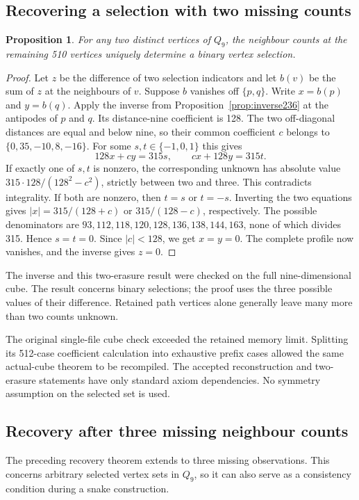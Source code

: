 \documentclass[11pt,a4paper]{article}
\newtheorem{proposition}[theorem]{Proposition}
\theoremstyle{definition}
\theoremstyle{remark}
\newcommand{\Q}{Q}
\begin{document}
\subsection{Recovering a selection with two missing counts}\label{sec:erasure237}
\begin{proposition}
For any two distinct vertices of $\Q_9$, the neighbour counts at the
remaining 510 vertices uniquely determine a binary vertex selection.
\end{proposition}
\begin{proof}
Let $z$ be the difference of two selection indicators and let $b(v)$
be the sum of $z$ at the neighbours of $v$. Suppose $b$ vanishes off
$\{p,q\}$. Write $x=b(p)$ and $y=b(q)$. Apply the inverse from
Proposition~\ref{prop:inverse236} at the antipodes of $p$ and $q$.
Its distance-nine coefficient is 128. The two off-diagonal distances
are equal and below nine, so their common coefficient $c$ belongs to
$\{0,35,-10,8,-16\}$. For some $s,t\in\{-1,0,1\}$ this gives
\[
 128x+cy=315s,\qquad cx+128y=315t.
\]
If exactly one of $s,t$ is nonzero, the corresponding unknown has
absolute value $315\cdot128/(128^2-c^2)$, strictly between two and
three. This contradicts integrality. If both are nonzero, then $t=s$
or $t=-s$. Inverting the two equations gives
$|x|=315/(128+c)$ or $315/(128-c)$, respectively. The possible
denominators are $93,112,118,120,128,136,138,144,163$, none of which
divides 315. Hence $s=t=0$. Since $|c|<128$, we get $x=y=0$.
The complete profile now vanishes, and the inverse gives $z=0$.
\end{proof}
The inverse and this two-erasure result were checked on the full
nine-dimensional cube. The result concerns binary selections; the proof
uses the three possible values of their difference. Retained path
vertices alone generally leave many more than two counts unknown.


The original single-file cube check exceeded the retained memory limit.
Splitting its 512-case coefficient calculation into exhaustive prefix
cases allowed the same actual-cube theorem to be recompiled. The
accepted reconstruction and two-erasure statements have only standard
axiom dependencies. No symmetry assumption on the selected set is used.


\subsection{Recovery after three missing neighbour counts}
\label{sec:three-erasure238}
The preceding recovery theorem extends to three missing observations.
This concerns arbitrary selected vertex sets in $Q_9$, so it can also
serve as a consistency condition during a snake construction.
\end{document}
